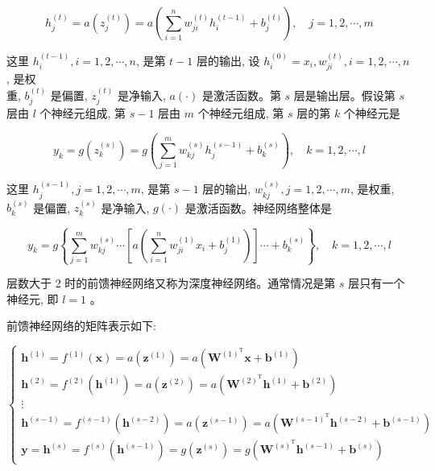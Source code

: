 \documentclass[10pt]{article}
\begin{document}
\begin{CJK*}{UTF8}{bsmi}
\begin{equation*}
h_{j}^{(t)}=a\left(z_{j}^{(t)}\right)=a\left(\sum_{i=1}^{n} w_{j i}^{(t)} h_{i}^{(t-1)}+b_{j}^{(t)}\right), \quad j=1,2, \cdots, m \tag{23.10}
\end{equation*}


这里 $h_{i}^{(t-1)}, i=1,2, \cdots, n$, 是第 $t-1$ 层的输出, 设 $h_{i}^{(0)}=x_{i}, w_{j i}^{(t)}, i=1,2, \cdots, n$, 是权\\
重, $b_{j}^{(t)}$ 是偏置, $z_{j}^{(t)}$ 是净输入, $a(\cdot)$ 是激活函数。第 $s$ 层是输出层。假设第 $s$ 层由 $l$ 个神经元组成, 第 $s-1$ 层由 $m$ 个神经元组成, 第 $s$ 层的第 $k$ 个神经元是


\begin{equation*}
y_{k}=g\left(z_{k}^{(s)}\right)=g\left(\sum_{j=1}^{m} w_{k j}^{(s)} h_{j}^{(s-1)}+b_{k}^{(s)}\right), \quad k=1,2, \cdots, l \tag{23.11}
\end{equation*}


这里 $h_{j}^{(s-1)}, j=1,2, \cdots, m$, 是第 $s-1$ 层的输出, $w_{k j}^{(s)}, j=1,2, \cdots, m$, 是权重, $b_{k}^{(s)}$ 是偏置, $z_{k}^{(s)}$ 是净输入, $g(\cdot)$ 是激活函数。神经网络整体是


\begin{equation*}
y_{k}=g\left\{\sum_{j=1}^{m} w_{k j}^{(s)} \cdots\left[a\left(\sum_{i=1}^{n} w_{j i}^{(1)} x_{i}+b_{j}^{(1)}\right)\right] \cdots+b_{k}^{(s)}\right\}, \quad k=1,2, \cdots, l \tag{23.12}
\end{equation*}


层数大于 2 时的前馈神经网络又称为深度神经网络。通常情况是第 $s$ 层只有一个神经元, 即 $l=1$ 。

前馈神经网络的矩阵表示如下:

\[
\left\{\begin{array}{l}
\boldsymbol{h}^{(1)}=f^{(1)}(\boldsymbol{x})=a\left(\boldsymbol{z}^{(1)}\right)=a\left(\boldsymbol{W}^{(1)^{\mathrm{T}}} \boldsymbol{x}+\boldsymbol{b}^{(1)}\right)  \tag{23.13}\\
\boldsymbol{h}^{(2)}=f^{(2)}\left(\boldsymbol{h}^{(1)}\right)=a\left(\boldsymbol{z}^{(2)}\right)=a\left(\boldsymbol{W}^{(2)^{\mathrm{T}}} \boldsymbol{h}^{(1)}+\boldsymbol{b}^{(2)}\right) \\
\vdots \\
\boldsymbol{h}^{(s-1)}=f^{(s-1)}\left(\boldsymbol{h}^{(s-2)}\right)=a\left(\boldsymbol{z}^{(s-1)}\right)=a\left(\boldsymbol{W}^{(s-1)^{\mathrm{T}}} \boldsymbol{h}^{(s-2)}+\boldsymbol{b}^{(s-1)}\right) \\
\boldsymbol{y}=\boldsymbol{h}^{(s)}=f^{(s)}\left(\boldsymbol{h}^{(s-1)}\right)=g\left(\boldsymbol{z}^{(s)}\right)=g\left(\boldsymbol{W}^{(s)^{\mathrm{T}}} \boldsymbol{h}^{(s-1)}+\boldsymbol{b}^{(s)}\right)
\end{array}\right.
\]


\end{CJK*}
\end{document}
